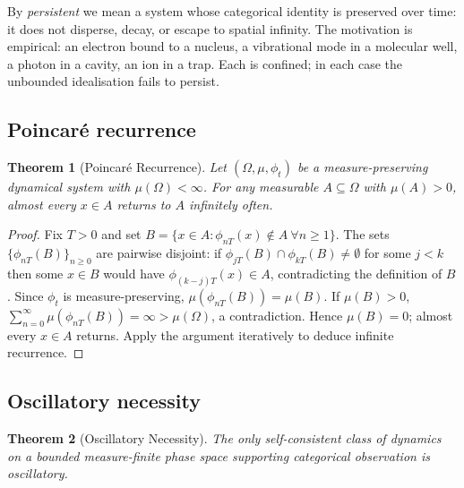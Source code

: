 \documentclass[twocolumn,10pt,a4paper]{article}
\theoremstyle{thmstyle}
\newtheorem{theorem}{Theorem}[section]
\theoremstyle{definition}
\theoremstyle{remark}
\begin{document}
By \emph{persistent} we mean a system whose categorical identity is
preserved over time: it does not disperse, decay, or escape to spatial
infinity. The motivation is empirical: an electron bound to a nucleus,
a vibrational mode in a molecular well, a photon in a cavity, an ion
in a trap. Each is confined; in each case the unbounded idealisation
fails to persist.

\subsection{Poincar\'{e} recurrence}

\begin{theorem}[Poincar\'{e} Recurrence]
\label{thm:poincare}
Let $(\Omega,\mu,\phi_{t})$ be a measure-preserving dynamical system
with $\mu(\Omega)<\infty$. For any measurable $A\subseteq\Omega$ with
$\mu(A)>0$, almost every $x\in A$ returns to $A$ infinitely often.
\end{theorem}

\begin{proof}
Fix $T>0$ and set
$B=\{x\in A:\phi_{nT}(x)\notin A\ \forall n\geq 1\}$.
The sets $\{\phi_{nT}(B)\}_{n\geq 0}$ are pairwise disjoint: if
$\phi_{jT}(B)\cap\phi_{kT}(B)\neq\emptyset$ for some $j<k$ then some
$x\in B$ would have $\phi_{(k-j)T}(x)\in A$, contradicting the
definition of $B$. Since $\phi_{t}$ is measure-preserving,
$\mu(\phi_{nT}(B))=\mu(B)$. If $\mu(B)>0$,
$\sum_{n=0}^{\infty}\mu(\phi_{nT}(B))=\infty>\mu(\Omega)$, a
contradiction. Hence $\mu(B)=0$; almost every $x\in A$ returns. Apply
the argument iteratively to deduce infinite recurrence.
\end{proof}

\subsection{Oscillatory necessity}

\begin{theorem}[Oscillatory Necessity]
\label{thm:osc}
The only self-consistent class of dynamics on a bounded measure-finite
phase space supporting categorical observation is oscillatory.
\end{theorem}
\end{document}
